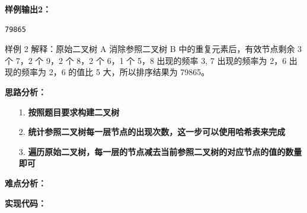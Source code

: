 \documentclass[a4paper]{ctexart}
\begin{document}
\noindent\textbf{样例输出2：}
\lstset{numbers=none}
\begin{lstlisting}
79865
\end{lstlisting}
\lstset{numbers=left}

\noindent 样例 2 解释：原始二叉树 A 消除参照二叉树 B 中的重复元素后，有效节点剩余 3 个 7，2 个 9，2 个 8，2 个 6，1 个 5，8 出现的频率 3, 7 出现的频率为 2，6 出现的频率为 2，6 的值比 5 大，所以排序结果为 79865。
	
\vspace{10pt}
	
\noindent\textbf{思路分析：}
\begin{itemize}
	\item [1.] \textbf{按照题目要求构建二叉树} 
	
	\item [2.] \textbf{统计参照二叉树每一层节点的出现次数，这一步可以使用哈希表来完成}
	
	\item [3.] \textbf{遍历原始二叉树，每一层的节点减去当前参照二叉树的对应节点的值的数量即可}
\end{itemize}

\noindent\textbf{难点分析：}

\noindent\textbf{实现代码：}
	
\end{document}
